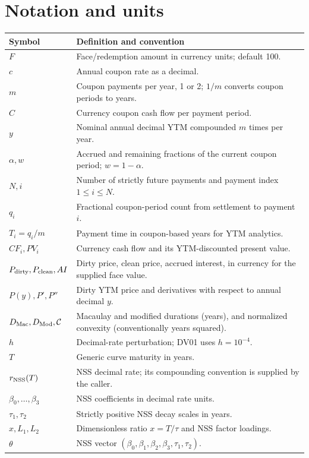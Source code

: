 \documentclass[12pt,a4paper]{article}
\begin{document}
\section{Notation and units}
\small
\begin{longtable}{@{}p{}p{}@{}}
\toprule
Symbol & Definition and convention\\
\midrule
\endhead
$F$ & Face/redemption amount in currency units; default 100.\\
$c$ & Annual coupon rate as a decimal.\\
$m$ & Coupon payments per year, 1 or 2; $1/m$ converts coupon periods to years.\\
$C$ & Currency coupon cash flow per payment period.\\
$y$ & Nominal annual decimal YTM compounded $m$ times per year.\\
$\alpha,w$ & Accrued and remaining fractions of the current coupon period; $w=1-\alpha$.\\
$N,i$ & Number of strictly future payments and payment index $1\leq i\leq N$.\\
$q_i$ & Fractional coupon-period count from settlement to payment $i$.\\
$T_i=q_i/m$ & Payment time in coupon-based years for YTM analytics.\\
$CF_i,PV_i$ & Currency cash flow and its YTM-discounted present value.\\
$P_{\rm dirty},P_{\rm clean},AI$ & Dirty price, clean price, accrued interest, in currency for the supplied face value.\\
$P(y),P',P''$ & Dirty YTM price and derivatives with respect to annual decimal $y$.\\
$D_{\rm Mac},D_{\rm Mod},\mathcal C$ & Macaulay and modified durations (years), and normalized convexity (conventionally years squared).\\
$h$ & Decimal-rate perturbation; DV01 uses $h=10^{-4}$.\\
$T$ & Generic curve maturity in years.\\
$r_{\rm NSS}(T)$ & NSS decimal rate; its compounding convention is supplied by the caller.\\
$\beta_0,\ldots,\beta_3$ & NSS coefficients in decimal rate units.\\
$\tau_1,\tau_2$ & Strictly positive NSS decay scales in years.\\
$x,L_1,L_2$ & Dimensionless ratio $x=T/\tau$ and NSS factor loadings.\\
$\theta$ & NSS vector $(\beta_0,\beta_1,\beta_2,\beta_3,\tau_1,\tau_2)$.\\

\end{longtable}
\end{document}

